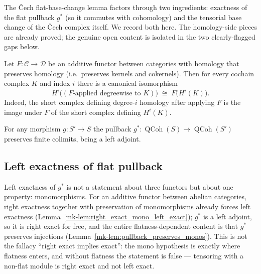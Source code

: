 The {\v C}ech flat-base-change lemma factors through two ingredients: exactness of the
flat pullback \(g^*\) (so it commutes with cohomology) and the tensorial base change of
the {\v C}ech complex itself. We record both here. The homology-side pieces are
already proved; the genuine open content is isolated in the two clearly-flagged gaps below.

\begin{lemma}\label{mk-lem:map_hc_homology_iso}
  \leanok

  Let \(F : \mathcal{C} \to \mathcal{D}\) be an additive functor between categories
  with homology that preserves homology (i.e.\ preserves kernels and cokernels). Then
  for every cochain complex \(K\) and index \(i\) there is a canonical isomorphism
  \[
    H^i\bigl((F\text{-applied degreewise to } K)\bigr) \;\cong\; F\bigl(H^i(K)\bigr).
  \]
  Indeed, the short complex defining degree-\(i\) homology after applying \(F\) is the
  image under \(F\) of the short complex defining \(H^i(K)\).
\end{lemma}

\begin{lemma}\label{mk-lem:pullback_preserves_finite_colimits}
  \leanok

  For any morphism \(g : S' \to S\) the pullback \(g^* : \operatorname{QCoh}(S) \to
  \operatorname{QCoh}(S')\) preserves finite colimits, being a left adjoint.
\end{lemma}

\subsection{Left exactness of flat pullback}
\label{mk-sec:pullback_pfl_decomposition}

Left exactness of \(g^*\) is not a statement about three functors but about one property:
monomorphisms. For an additive functor between abelian categories, right exactness together
with preservation of monomorphisms already forces left exactness
(Lemma~\ref{mk-lem:right_exact_mono_left_exact}); \(g^*\) is a left adjoint, so it is right exact
for free, and the entire flatness-dependent content is that \(g^*\) preserves injections
(Lemma~\ref{mk-lem:pullback_preserves_monos}). This is not the fallacy ``right exact implies
exact'': the mono hypothesis is exactly where flatness enters, and without flatness the
statement is false --- tensoring with a non-flat module is right exact and not left exact.

